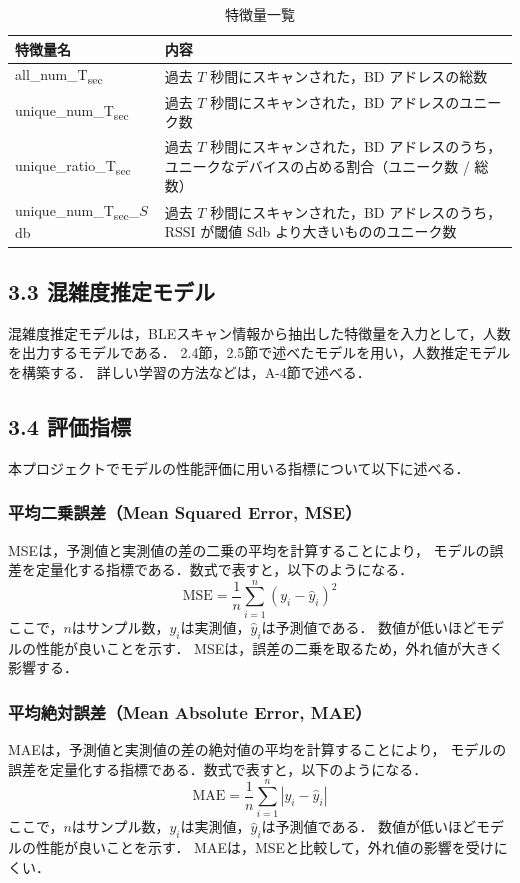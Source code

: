 \begin{table}[tb]
	\centering
	\caption{特徴量一覧}
	\label{tbl:feastures}
	\small
	\doublerulesep=0.3pt
    \begin{tabular}{l|p{5cm}} \hline\hline\hline
		特徴量名 & 内容 \\ \hline
		all\_num\_T\textsubscript{sec} & 過去 $T$ 秒間にスキャンされた，BD アドレスの総数\\ \hline
    unique\_num\_T\textsubscript{sec} & 過去 $T$ 秒間にスキャンされた，BD アドレスのユニーク数 \\ \hline
    unique\_ratio\_T\textsubscript{sec} & 過去 $T$ 秒間にスキャンされた，BD アドレスのうち，ユニークなデバイスの占める割合（ユニーク数 / 総数） \\ \hline
    unique\_num\_T\textsubscript{sec}\_$S$db & 過去 $T$ 秒間にスキャンされた，BD アドレスのうち，RSSI が閾値 Sdb より大きいもののユニーク数 \\ \hline\hline\hline
	\end{tabular}
\end{table}

\subsection*{3.3 混雑度推定モデル}
混雑度推定モデルは，BLEスキャン情報から抽出した特徴量を入力として，人数を出力するモデルである．
2.4節，2.5節で述べたモデルを用い，人数推定モデルを構築する．
詳しい学習の方法などは，A-4節で述べる．

\subsection*{3.4 評価指標}
本プロジェクトでモデルの性能評価に用いる指標について以下に述べる．

\subsubsection*{平均二乗誤差（Mean Squared Error, MSE）}
MSEは，予測値と実測値の差の二乗の平均を計算することにより，
モデルの誤差を定量化する指標である．数式で表すと，以下のようになる．
\begin{equation}
  \label{eq:mse}
  \mathrm{MSE} = \frac{1}{n} \sum_{i=1}^{n} (y_i - \hat{y}_i)^2
\end{equation}
ここで，$n$はサンプル数，$y_i$は実測値，$\hat{y}_i$は予測値である．
数値が低いほどモデルの性能が良いことを示す．
MSEは，誤差の二乗を取るため，外れ値が大きく影響する．

\subsubsection*{平均絶対誤差（Mean Absolute Error, MAE）}
MAEは，予測値と実測値の差の絶対値の平均を計算することにより，
モデルの誤差を定量化する指標である．数式で表すと，以下のようになる．
\begin{equation}
  \label{eq:mae}
  \mathrm{MAE} = \frac{1}{n} \sum_{i=1}^{n} |y_i - \hat{y}_i|
\end{equation}
ここで，$n$はサンプル数，$y_i$は実測値，$\hat{y}_i$は予測値である．
数値が低いほどモデルの性能が良いことを示す．
MAEは，MSEと比較して，外れ値の影響を受けにくい．

